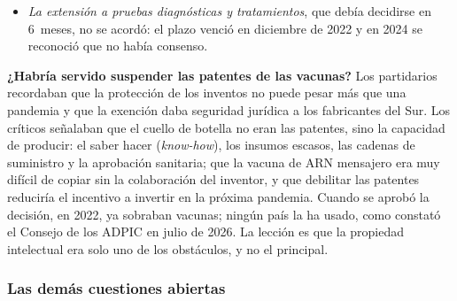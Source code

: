 \documentclass[11pt]{article}
\begin{document}
\begin{itemize}
  \begin{itemize}
  \item permite a los países en desarrollo autorizar sin consentimiento del titular la producción de \emph{vacunas} de la COVID-19, con cualquier instrumento de su derecho (decretos de urgencia, órdenes administrativas o judiciales) y sin negociar antes una licencia voluntaria;
  \item deja exportar \emph{cualquier proporción} de esa producción a otros países en desarrollo, sin el límite del artículo~31.f; la remuneración puede tener en cuenta el fin humanitario y sin ánimo de lucro, y la protección de los datos de prueba (artículo~39.3) no impide aprobar deprisa esas vacunas;
  \item rige 5~años (hasta junio de 2027, prorrogables por el Consejo General); se animó a los países en desarrollo con capacidad de fabricar vacunas a comprometerse a no usarla, y China lo hizo\nocite{OMC2022DecisionADPIC}.
  \end{itemize} \item \emph{La extensión a pruebas diagnósticas y tratamientos}, que debía decidirse en 6~meses, no se acordó: el plazo venció en diciembre de 2022 y en 2024 se reconoció que no había consenso\nocite{OMC2026ADPICCOVID}.
\end{itemize}

\begin{anotaciones}
\textbf{¿Habría servido suspender las patentes de las vacunas?} Los partidarios recordaban que la protección de los inventos no puede pesar más que una pandemia y que la exención daba seguridad jurídica a los fabricantes del Sur. Los críticos señalaban que el cuello de botella no eran las patentes, sino la capacidad de producir: el saber hacer (\emph{know-how}), los insumos escasos, las cadenas de suministro y la aprobación sanitaria; que la vacuna de ARN mensajero era muy difícil de copiar sin la colaboración del inventor, y que debilitar las patentes reduciría el incentivo a invertir en la próxima pandemia. Cuando se aprobó la decisión, en 2022, ya sobraban vacunas; ningún país la ha usado, como constató el Consejo de los ADPIC en julio de 2026. La lección es que la propiedad intelectual era solo uno de los obstáculos, y no el principal.
\end{anotaciones}

\subsubsection{Las demás cuestiones abiertas}\label{sec:adpic-abiertas}
\end{document}
